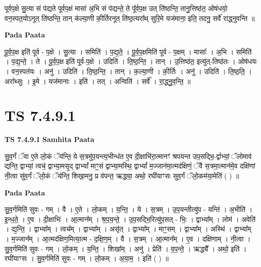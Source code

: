 \documentclass[17pt]{extarticle}
\begin{document}
पूर्वप॒क्षे सु॒त्या सं प॑द्यते पूर्वप॒क्षं मासा॑ अ॒भि सं प॑द्यन्ते॒ ते पू᳚र्वप॒क्ष उत् ति॑ष्ठन्ति॒ तानु॒त्तिष्ठ॑त॒ ओष॑धयो॒ वन॒स्पत॒योऽनूत् ति॑ष्ठन्ति॒ तान् क॑ल्या॒णी की॒र्तिरनूत् ति॑ष्ठ॒त्यरा᳚थ् सुरि॒मे यज॑माना॒ इति॒ तदनु॒ सर्वे॑ राद्ध्नुवन्ति ॥ \newline

\textbf{Pada Paata} \newline

पू॒र्व॒प॒क्ष इति॑ पूर्व - प॒क्षे । सु॒त्या । समिति॑ । प॒द्य॒ते॒ । पू॒र्व॒प॒क्षमिति॑ पूर्व - प॒क्षम् । मासाः᳚ । अ॒भि । समिति॑ । प॒द्य॒न्ते॒ । ते । पू॒र्व॒प॒क्ष इति॑ पूर्व-प॒क्षे । उदिति॑ । ति॒ष्ठ॒न्ति॒ । तान् । उ॒त्तिष्ठ॑त॒ इत्यु॑त्-तिष्ठ॑तः । ओष॑धयः । वन॒स्पत॑यः । अनु॑ । उदिति॑ । ति॒ष्ठ॒न्ति॒ । तान् । क॒ल्या॒णी । की॒र्तिः । अनु॑ । उदिति॑ । ति॒ष्ठ॒ति॒ । अरा᳚थ्सुः । इ॒मे । यज॑मानाः । इति॑ । तत् । अन्विति॑ । सर्वे᳚ । रा॒द्ध्नु॒व॒न्ति॒ ॥  \newline





\section{ TS 7.4.9.1 }

\textbf{TS 7.4.9.1 } \newline
\textbf{Samhita Paata} \newline

सु॒व॒र्गं ॅवा ए॒ते लो॒कं ॅय॑न्ति॒ ये स॒त्रमु॑प॒यन्त्य॒भीन्ध॑त ए॒व दी॒क्षाभि॑रा॒त्मानꣳ॑ श्रपयन्त उप॒सद्भि॒-र्द्वाभ्यां॒ ॅलोमाव॑ द्यन्ति॒ द्वाभ्यां॒ त्वचं॒ द्वाभ्या॒मसृ॒द् द्वाभ्यां᳚ माꣳ॒॒सं द्वाभ्या॒मस्थि॒ द्वाभ्यां᳚ म॒ज्जान॑मा॒त्मद॑क्षिणं॒ ॅवै स॒त्रमा॒त्मान॑मे॒व दक्षि॑णां नी॒त्वा सु॑व॒र्गं ॅलो॒कं ॅय॑न्ति॒ शिखा॒मनु॒ प्र व॑पन्त॒ ऋद्ध्या॒ अथो॒ रघी॑याꣳसः सुव॒र्गं ॅलो॒कम॑या॒मेति॑ ( ) ॥ \newline

\textbf{Pada Paata} \newline

सु॒व॒र्गमिति॑ सुवः - गम् । वै । ए॒ते । लो॒कम् । य॒न्ति॒ । ये । स॒त्रम् । उ॒प॒यन्तीत्यु॑प - यन्ति॑ । अ॒भीति॑ । इ॒न्ध॒ते॒ । ए॒व । दी॒क्षाभिः॑ । आ॒त्मान᳚म् । श्र॒प॒य॒न्ते॒ । उ॒प॒सद्भि॒रित्यु॑प॒सत् - भिः॒ । द्वाभ्या᳚म् । लोम॑ । अवेति॑ । द्य॒न्ति॒ । द्वाभ्या᳚म् । त्वच᳚म् । द्वाभ्या᳚म् । असृ॑त् । द्वाभ्या᳚म् । माꣳ॒॒सम् । द्वाभ्या᳚म् । अस्थि॑ । द्वाभ्या᳚म् । म॒ज्जान᳚म् । आ॒त्मद॑क्षिण॒मित्या॒त्म - द॒क्षि॒ण॒म् । वै । स॒त्रम् । आ॒त्मान᳚म् । ए॒व । दक्षि॑णाम् । नी॒त्वा । सु॒व॒र्गमिति॑ सुवः - गम् । लो॒कम् । य॒न्ति॒ । शिखा᳚म् । अनु॑ । प्रेति॑ । व॒प॒न्ते॒ । ऋद्ध्यै᳚ । अथो॒ इति॑ । रघी॑याꣳसः । सु॒व॒र्गमिति॑ सुवः - गम् । लो॒कम् । अ॒या॒म॒ । इति॑ ( ) ॥  \newline
\end{document}

